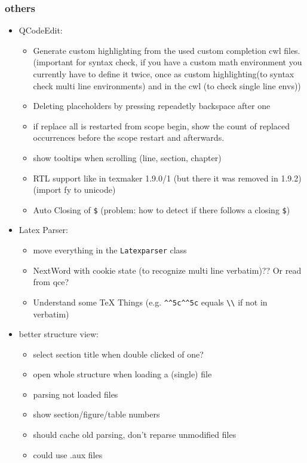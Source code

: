 \documentclass[10pt,a4paper,landscape]{report}
\begin{document}
\subsubsection{others}
\begin{itemize}
	\item QCodeEdit: \begin{itemize}
		\item Generate custom highlighting from the used custom completion cwl files. (important for syntax check, if you have a custom math environment you currently have to define it twice, once as custom highlighting(to syntax check multi line environments) and in the cwl (to check single line envs))
		\item Deleting placeholders by pressing repeadetly backspace after one
		\item if replace all is restarted from scope begin, show the count of replaced occurrences before the scope restart and afterwards.
		\item show tooltips when scrolling (line, section, chapter)
		\item RTL support like in texmaker 1.9.0/1 (but there it was removed in 1.9.2) (import fy to unicode)
		\item Auto Closing of \verb+$+ (problem: how to detect if there follows a closing \verb+$+)
	\end{itemize}
	\item Latex Parser: \begin{itemize}
		\item move everything in the \verb+Latexparser+ class
		\item NextWord with cookie state (to recognize multi line verbatim)?? Or read from qce?
		\item Understand some TeX Things (e.g. \verb+^^5c^^5c+ equals \verb+\\+ if not in verbatim)
	\end{itemize}
	\item better structure view: \begin{itemize}
		\item select section title when double clicked of one?	
		\item open whole structure when loading a (single)	 file
		\item parsing not loaded files
		\item show section/figure/table numbers
		\item should cache old parsing, don't reparse unmodified files
		\item could use .aux files

\end{itemize}
\end{itemize}
\end{document}
